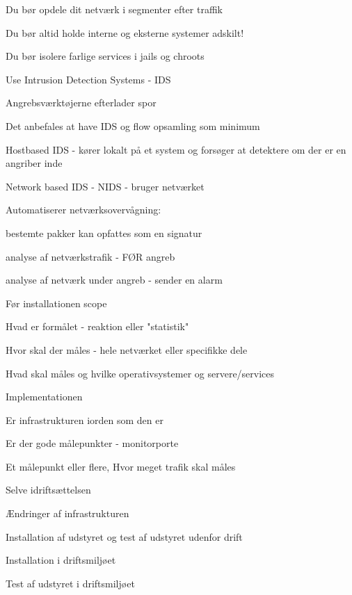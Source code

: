 \documentclass[Screen16to9,17pt]{foils}
\begin{document}
\begin{list1}
\item Du bør opdele dit netværk i segmenter efter traffik
\item Du bør altid holde interne og eksterne systemer adskilt!
\item Du bør isolere farlige services i jails og chroots
\end{list1}




\begin{list1}
\item Use Intrusion Detection Systems - IDS
\item Angrebsværktøjerne efterlader spor
\item Det anbefales at have IDS og flow opsamling som minimum
\item Hostbased IDS - kører lokalt på et system og forsøger at
  detektere om der er en angriber inde
\item Network based IDS - NIDS - bruger netværket
\item Automatiserer netværksovervågning:
  \begin{list2}
  \item bestemte pakker kan opfattes som en signatur
\item analyse af netværkstrafik - FØR angreb
\item analyse af netværk under angreb - sender en alarm
  \end{list2}
\end{list1}



\begin{list1}
\item Før installationen scope
\begin{list2}
\item Hvad er formålet - reaktion eller "statistik"
\item Hvor skal der måles - hele netværket eller specifikke dele
\item Hvad skal måles og hvilke operativsystemer og servere/services
\end{list2}
\item Implementationen
\begin{list2}
\item Er infrastrukturen iorden som den er
\item Er der gode målepunkter - monitorporte
\item Et målepunkt eller flere, Hvor meget trafik skal måles
\end{list2}
\item Selve idriftsættelsen
\begin{list2}
\item Ændringer af infrastrukturen
\item Installation af udstyret og test af udstyret udenfor drift
\item Installation i driftsmiljøet
\item Test af udstyret i driftsmiljøet
\end{list2}
\end{list1}
\end{document}
